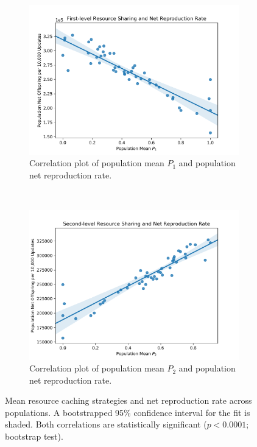 \begin{figure}
\begin{center}

\begin{subfigure}[b]{\columnwidth}
  \includegraphics[width=\columnwidth]{img/mean_res_pool1_vs_net_reproduction}
  \caption{
  Correlation plot of population mean $P_1$ and population net reproduction rate.
  }
  \label{fig:mean_res_pool1_vs_net_reproduction}
\end{subfigure}
~~
\begin{subfigure}[b]{\columnwidth}
  \includegraphics[width=\columnwidth]{img/mean_res_pool2_vs_net_reproduction}
  \caption{
  Correlation plot of population mean $P_2$ and population net reproduction rate.
  }
  \label{fig:mean_res_pool2_vs_net_reproduction}
\end{subfigure}
\caption{
Mean resource caching strategies and net reproduction rate across populations.
A bootstrapped 95\% confidence interval for the fit is shaded.
Both correlations are statistically significant ($p < 0.0001$; bootstrap test).
}
\label{fig:net_reproduction}
\end{center}
\end{figure}
